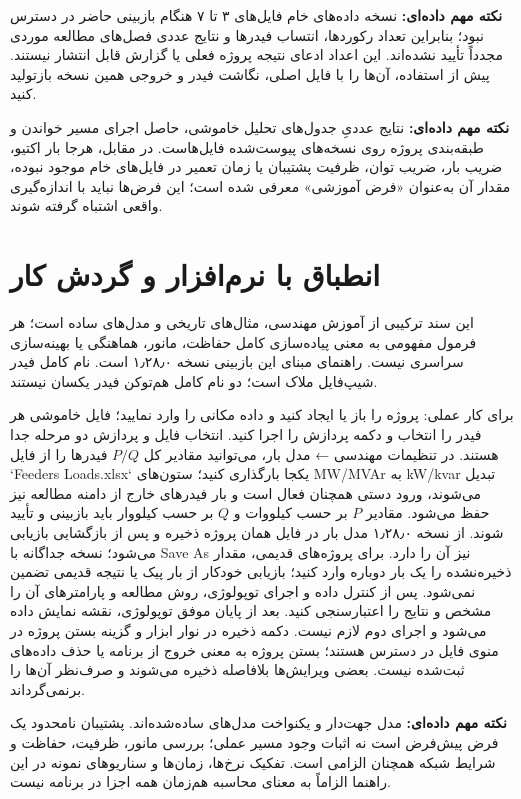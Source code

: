 \documentclass[11pt,a4paper,oneside]{book}
\newcommand{\warn}{\noindent\textbf{نکته مهم داده‌ای:} }
\begin{document}
\warn نسخه داده‌های خام فایل‌های ۳ تا ۷ هنگام بازبینی حاضر در دسترس نبود؛ بنابراین تعداد رکوردها، انتساب فیدرها و نتایج عددی فصل‌های مطالعه موردی مجدداً تأیید نشده‌اند. این اعداد ادعای نتیجه پروژه فعلی یا گزارش قابل انتشار نیستند. پیش از استفاده، آن‌ها را با فایل اصلی، نگاشت فیدر و خروجی همین نسخه بازتولید کنید.

\warn نتایج عددیِ جدول‌های تحلیل خاموشی، حاصل اجرای مسیر خواندن و طبقه‌بندی پروژه روی نسخه‌های پیوست‌شده فایل‌هاست. در مقابل، هرجا بار اکتیو، ضریب بار، ضریب توان، ظرفیت پشتیبان یا زمان تعمیر در فایل‌های خام موجود نبوده، مقدار آن به‌عنوان «فرض آموزشی» معرفی شده است؛ این فرض‌ها نباید با اندازه‌گیری واقعی اشتباه گرفته شوند.

\chapter*{انطباق با نرم‌افزار و گردش کار}
این سند ترکیبی از آموزش مهندسی، مثال‌های تاریخی و مدل‌های ساده است؛ هر فرمول مفهومی به معنی پیاده‌سازی کامل حفاظت، مانور، هماهنگی یا بهینه‌سازی سراسری نیست. راهنمای مبنای این بازبینی نسخه ۱٫۲۸٫۰ است. نام کامل فیدر شیپ‌فایل ملاک است؛ دو نام کامل هم‌توکن فیدر یکسان نیستند.

برای کار عملی: پروژه را باز یا ایجاد کنید و داده مکانی را وارد نمایید؛ فایل خاموشی هر فیدر را انتخاب و دکمه پردازش را اجرا کنید. انتخاب فایل و پردازش دو مرحله جدا هستند. در تنظیمات مهندسی ← مدل بار، می‌توانید مقادیر کل $P/Q$ فیدرها را از فایل `Feeders Loads.xlsx` یکجا بارگذاری کنید؛ ستون‌های MW/MVAr به kW/kvar تبدیل می‌شوند، ورود دستی همچنان فعال است و بار فیدرهای خارج از دامنه مطالعه نیز حفظ می‌شود. مقادیر $P$ بر حسب کیلووات و $Q$ بر حسب کیلووار باید بازبینی و تأیید شوند. از نسخه ۱٫۲۸٫۰ مدل بار در فایل همان پروژه ذخیره و پس از بازگشایی بازیابی می‌شود؛ نسخه جداگانه با Save As نیز آن را دارد. برای پروژه‌های قدیمی، مقدار ذخیره‌نشده را یک بار دوباره وارد کنید؛ بازیابی خودکار از بار پیک یا نتیجه قدیمی تضمین نمی‌شود. پس از کنترل داده و اجرای توپولوژی، روش مطالعه و پارامترهای آن را مشخص و نتایج را اعتبارسنجی کنید. بعد از پایان موفق توپولوژی، نقشه نمایش داده می‌شود و اجرای دوم لازم نیست. دکمه ذخیره در نوار ابزار و گزینه بستن پروژه در منوی فایل در دسترس هستند؛ بستن پروژه به معنی خروج از برنامه یا حذف داده‌های ثبت‌شده نیست. بعضی ویرایش‌ها بلافاصله ذخیره می‌شوند و صرف‌نظر آن‌ها را برنمی‌گرداند.

\warn مدل جهت‌دار و یکنواخت مدل‌های ساده‌شده‌اند. پشتیبان نامحدود یک فرض پیش‌فرض است نه اثبات وجود مسیر عملی؛ بررسی مانور، ظرفیت، حفاظت و شرایط شبکه همچنان الزامی است. تفکیک نرخ‌ها، زمان‌ها و سناریوهای نمونه در این راهنما الزاماً به معنای محاسبه هم‌زمان همه اجزا در برنامه نیست.
\end{document}
